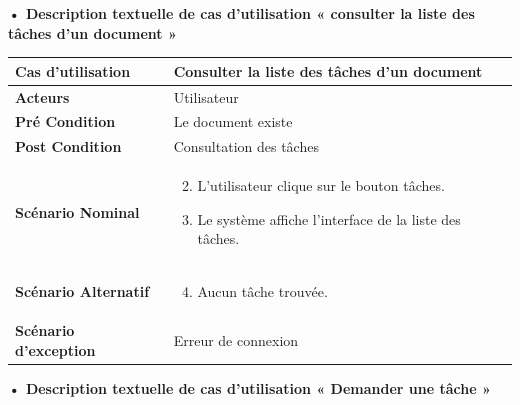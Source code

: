     
    



\textbf{•	Description textuelle de cas d'utilisation « consulter la liste des tâches d'un document »}

\begin{longtable}{|p{5cm}|p{10cm}|}
\hline
\textbf{Cas d'utilisation}&Consulter la liste des tâches d'un document\\
\hline
\textbf{Acteurs}&Utilisateur\\
\hline
\textbf{Pré Condition}&Le document existe\\
\hline
\textbf{Post Condition}&Consultation des tâches\\
\hline
\textbf{Scénario Nominal}&
\vspace{-\baselineskip}
\begin{enumerate}
    \setcounter{enumi}{1}
    \item L'utilisateur clique sur le bouton tâches.
    \item Le système affiche l'interface de la liste des tâches.
    
\end{enumerate}\\
\hline
\textbf{Scénario Alternatif}&
\vspace{-\baselineskip}
\begin{enumerate}
    \setcounter{enumi}{3}
    \item Aucun tâche trouvée.
\end{enumerate}\\
\hline
\textbf{Scénario d'exception}&Erreur de connexion\\
\hline
\end{longtable}



\textbf{•	Description textuelle de cas d'utilisation « Demander une tâche »}


